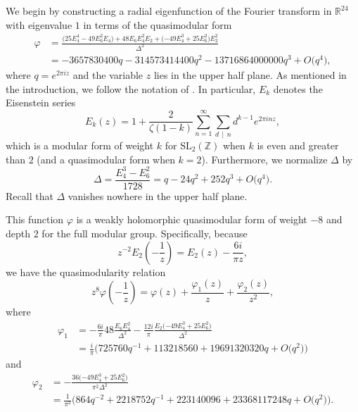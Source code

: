 \documentclass{aomart}
\theoremstyle{plain}
\numberwithin{theorem}{section}
\numberwithin{equation}{section}
\newcommand{\R}{{\mathbb R}}
\newcommand{\Z}{{\mathbb Z}}
\begin{document}
We begin by constructing a radial eigenfunction of the Fourier transform in
$\R^{24}$ with eigenvalue $1$ in terms of the quasimodular form
\begin{equation} \label{eq:phidef}
\begin{split}
\varphi &= \frac{\big(25E_4^4 - 49E_6^2E_4\big) + 48E_6E_4^2E_2 + \big({-49}E_4^3 + 25E_6^2\big)E_2^2}{\Delta^2}\\
&= -3657830400 q
 - 314573414400 q^2
 - 13716864000000 q^3+ O\big(q^4\big),
\end{split}
\end{equation}
where $q = e^{2\pi i z}$ and the variable $z$ lies in the upper half plane.
As mentioned in the introduction, we follow the notation of \cite{V}. In
particular, $E_k$ denotes the Eisenstein series
\[
E_k(z) = 1 + \frac{2}{\zeta(1-k)}\sum_{n=1}^\infty \sum_{d \,\mid\, n} d^{k-1} e^{2\pi i n z},
\]
which is a modular form of weight $k$ for $\mathrm{SL}_2(\Z)$ when $k$ is
even and greater than $2$ (and a quasimodular form when $k=2$). Furthermore,
we normalize $\Delta$ by
\[
\Delta = \frac{E_4^3-E_6^2}{1728} = q - 24q^2 + 252q^3 + O\big(q^4\big).
\]
Recall that $\Delta$ vanishes nowhere in the upper half plane.

This function $\varphi$ is a weakly holomorphic quasimodular form of weight
$-8$ and depth $2$ for the full modular group.  Specifically, because
\[
z^{-2}E_2\mathopen{}\left(-\frac{1}{z}\right)\mathclose{} = E_2(z) - \frac{6i}{\pi z},
\]
we have the quasimodularity relation
\begin{equation}
\label{eq:quasimodular}
z^8 \varphi\mathopen{}\left(-\frac{1}{z}\right)\mathclose{} = \varphi(z) + \frac{\varphi_1(z)}{z} + \frac{\varphi_2(z)}{z^2},
\end{equation}
where
\begin{align*}
\varphi_1 &= -\frac{6i}{\pi} 48\frac{E_6E_4^2}{\Delta^2} - \frac{12i}{\pi} \frac{E_2 \big({-49E_4^3} + 25E_6^2\big)}{\Delta^2}\\
&= \frac{i}{\pi}\Big(725760 q^{-1}
 + 113218560
 + 19691320320 q+ O\big(q^2\big)\Big)
\end{align*}
and
\begin{align*}
\varphi_2 &= - \frac{36\big({-49E_4^3} + 25E_6^2\big)}{\pi^2\Delta^2}\\
&= \frac{1}{\pi^2}\Big(864 q^{-2}
 + 2218752 q^{-1}
 + 223140096
 + 23368117248 q+ O\big(q^2\big)\Big).
\end{align*}
\end{document}
